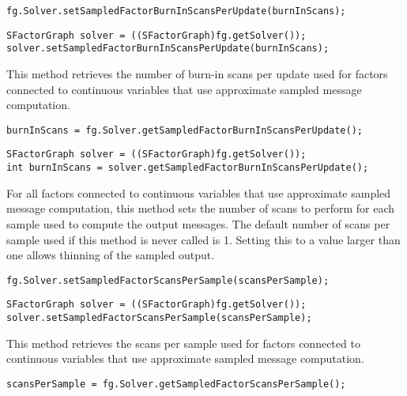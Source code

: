 \ifmatlab
\begin{lstlisting}
fg.Solver.setSampledFactorBurnInScansPerUpdate(burnInScans);
\end{lstlisting}
\fi

\ifjava
\begin{lstlisting}
SFactorGraph solver = ((SFactorGraph)fg.getSolver());
solver.setSampledFactorBurnInScansPerUpdate(burnInScans);
\end{lstlisting}
\fi



This method retrieves the number of burn-in scans per update used for factors connected to continuous variables that use approximate sampled message computation.

\ifmatlab
\begin{lstlisting}
burnInScans = fg.Solver.getSampledFactorBurnInScansPerUpdate();
\end{lstlisting}
\fi

\ifjava
\begin{lstlisting}
SFactorGraph solver = ((SFactorGraph)fg.getSolver());
int burnInScans = solver.getSampledFactorBurnInScansPerUpdate();
\end{lstlisting}
\fi



For all factors connected to continuous variables that use approximate sampled message computation, this method sets the number of scans to perform for each sample used to compute the output messages.  The default number of scans per sample used if this method is never called is 1.  Setting this to a value larger than one allows thinning of the sampled output.

\ifmatlab
\begin{lstlisting}
fg.Solver.setSampledFactorScansPerSample(scansPerSample);
\end{lstlisting}
\fi

\ifjava
\begin{lstlisting}
SFactorGraph solver = ((SFactorGraph)fg.getSolver());
solver.setSampledFactorScansPerSample(scansPerSample);
\end{lstlisting}
\fi


This method retrieves the scans per sample used for factors connected to continuous variables that use approximate sampled message computation.

\ifmatlab
\begin{lstlisting}
scansPerSample = fg.Solver.getSampledFactorScansPerSample();
\end{lstlisting}
\fi

